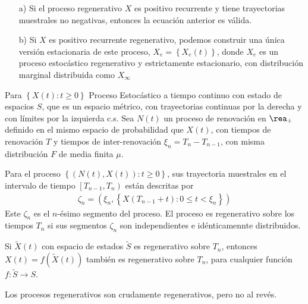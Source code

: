 \begin{Note}
\begin{itemize}
\item[a)] Si el proceso regenerativo $X$ es positivo recurrente y tiene trayectorias muestrales no negativas, entonces la ecuaci\'on anterior es v\'alida.
\item[b)] Si $X$ es positivo recurrente regenerativo, podemos construir una \'unica versi\'on estacionaria de este proceso, $X_{e}=\left\{X_{e}\left(t\right)\right\}$, donde $X_{e}$ es un proceso estoc\'astico regenerativo y estrictamente estacionario, con distribuci\'on marginal distribuida como $X_{\infty}$
\end{itemize}
\end{Note}

Para $\left\{X\left(t\right):t\geq0\right\}$ Proceso Estoc\'astico a tiempo continuo con estado de espacios $S$, que es un espacio m\'etrico, con trayectorias continuas por la derecha y con l\'imites por la izquierda c.s. Sea $N\left(t\right)$ un proceso de renovaci\'on en $\rea_{+}$ definido en el mismo espacio de probabilidad que $X\left(t\right)$, con tiempos de renovaci\'on $T$ y tiempos de inter-renovaci\'on $\xi_{n}=T_{n}-T_{n-1}$, con misma distribuci\'on $F$ de media finita $\mu$.


\begin{Def}
Para el proceso $\left\{\left(N\left(t\right),X\left(t\right)\right):t\geq0\right\}$, sus trayectoria muestrales en el intervalo de tiempo $\left[T_{n-1},T_{n}\right)$ est\'an descritas por
\begin{eqnarray*}
\zeta_{n}=\left(\xi_{n},\left\{X\left(T_{n-1}+t\right):0\leq t<\xi_{n}\right\}\right)
\end{eqnarray*}
Este $\zeta_{n}$ es el $n$-\'esimo segmento del proceso. El proceso es regenerativo sobre los tiempos $T_{n}$ si sus segmentos $\zeta_{n}$ son independientes e id\'enticamennte distribuidos.
\end{Def}


\begin{Note}
Si $\tilde{X}\left(t\right)$ con espacio de estados $\tilde{S}$ es regenerativo sobre $T_{n}$, entonces $X\left(t\right)=f\left(\tilde{X}\left(t\right)\right)$ tambi\'en es regenerativo sobre $T_{n}$, para cualquier funci\'on $f:\tilde{S}\rightarrow S$.
\end{Note}

\begin{Note}
Los procesos regenerativos son crudamente regenerativos, pero no al rev\'es.
\end{Note}

